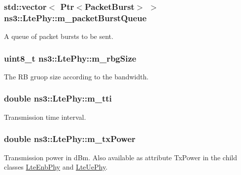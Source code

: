 \subsubsection[{\texorpdfstring{m\+\_\+packet\+Burst\+Queue}{m_packetBurstQueue}}]{\setlength{\rightskip}{0pt plus 5cm}std\+::vector$<$ {\bf Ptr}$<${\bf Packet\+Burst}$>$ $>$ ns3\+::\+Lte\+Phy\+::m\+\_\+packet\+Burst\+Queue\hspace{0.3cm}{\ttfamily [protected]}}\hypertarget{classns3_1_1LtePhy_a40aeb0f1fd33acac2d7e0a9f4b320017}{}\label{classns3_1_1LtePhy_a40aeb0f1fd33acac2d7e0a9f4b320017}


A queue of packet bursts to be sent. 

\subsubsection[{\texorpdfstring{m\+\_\+rbg\+Size}{m_rbgSize}}]{\setlength{\rightskip}{0pt plus 5cm}uint8\+\_\+t ns3\+::\+Lte\+Phy\+::m\+\_\+rbg\+Size\hspace{0.3cm}{\ttfamily [protected]}}\hypertarget{classns3_1_1LtePhy_af18a95f518b590c96f32ef18fefed7f7}{}\label{classns3_1_1LtePhy_af18a95f518b590c96f32ef18fefed7f7}


The RB gruop size according to the bandwidth. 

\subsubsection[{\texorpdfstring{m\+\_\+tti}{m_tti}}]{\setlength{\rightskip}{0pt plus 5cm}double ns3\+::\+Lte\+Phy\+::m\+\_\+tti\hspace{0.3cm}{\ttfamily [protected]}}\hypertarget{classns3_1_1LtePhy_ad20890127f2da3c4fd4c99507177b55c}{}\label{classns3_1_1LtePhy_ad20890127f2da3c4fd4c99507177b55c}


Transmission time interval. 

\subsubsection[{\texorpdfstring{m\+\_\+tx\+Power}{m_txPower}}]{\setlength{\rightskip}{0pt plus 5cm}double ns3\+::\+Lte\+Phy\+::m\+\_\+tx\+Power\hspace{0.3cm}{\ttfamily [protected]}}\hypertarget{classns3_1_1LtePhy_a09eff916f067eab2f7bf4f7b5f7f2750}{}\label{classns3_1_1LtePhy_a09eff916f067eab2f7bf4f7b5f7f2750}
Transmission power in d\+Bm. Also available as attribute {\ttfamily Tx\+Power} in the child classes \hyperlink{classns3_1_1LteEnbPhy}{Lte\+Enb\+Phy} and \hyperlink{classns3_1_1LteUePhy}{Lte\+Ue\+Phy}. 
